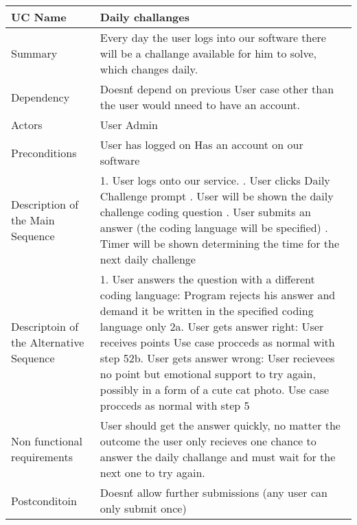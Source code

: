 \begin{table}[htbp]
\centering
\begin{tabularx}{\textwidth}{|l|X|}
\hline
UC Name & Daily challanges \\ \hline

Summary &  Every day the user logs into our software there will be a challange available for him to solve, which changes daily. \\ \hline

Dependency & Doesn\'t depend on previous User case other than the user would nneed to have an account. \\ \hline

Actors & User \newline Admin \\ \hline

Preconditions & \-User has logged on \newline \-Has an account on our software \\ \hline

Description of the Main Sequence & 1.	User logs onto our service.  \newline  2.	User clicks Daily Challenge prompt \newline 3.	User will be shown the daily challenge coding question  \newline4.	User submits an answer (the coding language will be specified) \newline5.	Timer will be shown determining the time for the next daily challenge \\ \hline

Descriptoin of the Alternative Sequence & 1. User answers the question with a different coding language: \newline\- Program rejects his answer and demand it be written in the specified coding language only  \newline2a. User gets answer right: \newline\-	User receives points\newline\-	Use case procceds as normal with step 5\newline2b. User gets answer wrong: \newline\-	User recievees no point but emotional support to try again, possibly in a form of a cute cat photo. \newline\-	Use case procceds as normal with step 5 \\ \hline

Non functional requirements & User should get the answer quickly, no matter the outcome the user only recieves one chance to answer the daily challange and must wait for the next one to try again. \\ \hline

Postconditoin & Doesn\'t allow further submissions (any user can only submit once) \\ \hline

\end{tabularx}
\end{table}

